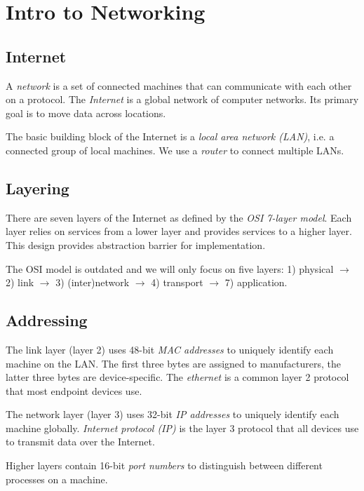 \chapter{Intro to Networking}

\section{Internet}
A \emph{network} is a set of connected machines that can communicate with each other on a protocol. The \emph{Internet} is a global network of computer networks. Its primary goal is to move data across locations.

\medskip
The basic building block of the Internet is a \emph{local area network (LAN)}, i.e. a connected group of local machines. We use a \emph{router} to connect multiple LANs.

\section{Layering}
There are seven layers of the Internet as defined by the \emph{OSI 7-layer model}. Each layer relies on services from a lower layer and provides services to a higher layer. This design provides abstraction barrier for implementation. 

\medskip
The OSI model is outdated and we will only focus on five layers: 1) physical $\rightarrow$ 2) link $\rightarrow$ 3) (inter)network $\rightarrow$ 4) transport $\rightarrow$ 7) application.

\section{Addressing}
The link layer (layer 2) uses 48-bit \emph{MAC addresses} to uniquely identify each machine on the LAN. The first three bytes are assigned to manufacturers, the latter three bytes are device-specific. The \emph{ethernet} is a common layer 2 protocol that most endpoint devices use. 

\medskip
The network layer (layer 3) uses 32-bit \emph{IP addresses} to uniquely identify each machine globally. \emph{Internet protocol (IP)} is the layer 3 protocol that all devices use to transmit data over the Internet.

\medskip
Higher layers contain 16-bit \emph{port numbers} to distinguish between different processes on a machine.